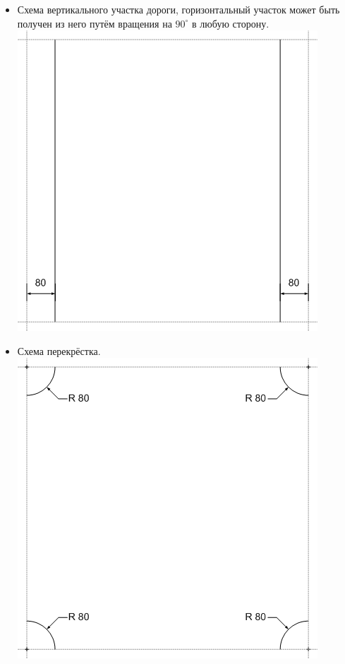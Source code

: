 \begin{itemize}
\newpage
\item Схема вертикального участка дороги, горизонтальный участок может быть получен из него путём вращения на $90^\circ$ в любую сторону.
\includegraphics{images/tiles/Vertical.png}

\newpage
\item Схема перекрёстка.
\includegraphics{images/tiles/Crossroads.png}
\end{itemize}

